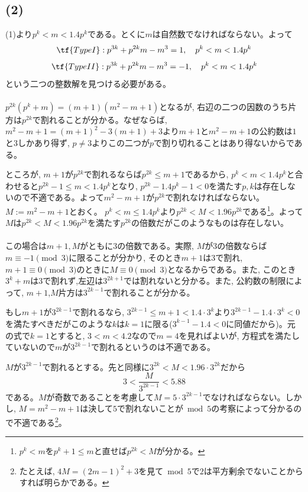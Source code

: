 \subsection*{(2)}
(1)より$p^{k} < m < 1.4p^{k}$である。とくに$m$は自然数でなければならない。よって
\[\tf{Type I}: p^{3k} + p^{2k}m - m^{3}=1,\quad p^{k} < m < 1.4p^{k}\]
\[\tf{Type II}: p^{3k} + p^{2k}m - m^{3}=-1,\quad p^{k} < m < 1.4p^{k}\]
という二つの整数解を見つける必要がある。\\
\\
$p^{2k}(p^{k} + m) = (m+1) (m^2-m+1)$となるが, 右辺の二つの因数のうち片方は$p^{2k}$で割れることが分かる。なぜならば, $m^2-m+1 = (m+1)^2 - 3(m+1) + 3$より$m+1$と$m^2 - m +1$の公約数は$1$と$3$しかあり得ず, $p\neq 3$よりこの二つが$p$で割り切れることはあり得ないからである。\par
ところが, $m+1$が$p^{2k}$で割れるならば$p^{2k} \leq m+1$であるから, $p^{k} < m < 1.4p^{k}$と合わせると$p^{2k} -1 \leq m < 1.4p^{k}$となり, $p^{2k} - 1.4p^{k} - 1 < 0$を満たす$p,k$は存在しないので不適である。よって$m^2 - m +1$が$p^{2k}$で割れなければならない。$M:=m^2- m+1$とおく。 $p^{k} < m \leq 1.4p^{k}$より$p^{2k} < M< 1.96p^{2k}$である\footnote{$p^{k} < m$を$p^{k} + 1\leq m$と直せば$p^{2k} < M$が分かる。}。よって$M$は$p^{2k} < M < 1.96p^{2k}$を満たす$p^{2k}$の倍数だがこのようなものは存在しない。\\
\\
この場合は$m+1, M$がともに3の倍数である。実際, $M$が$3$の倍数ならば$m\equiv -1\pmod{3}$に限ることが分かり, そのとき$m+1$は$3$で割れ, $m+1\equiv 0\pmod{3}$のときに$M\equiv 0\pmod{3}$となるからである。また, このとき$3^{k} + m$は$3$で割れず,左辺は$3^{2k+1}$では割れないと分かる。また, 公約数の制限によって, $m+1$,$M$片方は$3^{2k-1}$で割れることが分かる。\par
もし$m+1$が$3^{2k-1}$で割れるなら, $3^{2k-1} \leq m+1 < 1.4\cdot 3^{k}$より$3^{2k-1} - 1.4\cdot 3^{k} < 0$を満たすべきだがこのような$k$は$k=1$に限る($3^{k-1} - 1.4 < 0$に同値だから)。元の式で$k=1$とすると, $3<m<4.2$なので$m=4$を見ればよいが, 方程式を満たしていないので$m$が$3^{2k-1}$で割れるというのは不適である。\par
$M$が$3^{2k-1}$で割れるとする。先と同様に$3^{2k} < M < 1.96\cdot 3^{2k}$だから
\[3 < \dfrac{M}{3^{2k-1}} < 5.88\]
である。$M$が奇数であることを考慮して$M = 5\cdot 3^{2k-1}$でなければならない。しかし, $M=m^2 - m +1$は決して$5$で割れないことが$\bmod{5}$の考察によって分かるので不適である\footnote{たとえば, $4M = (2m-1)^{2} + 3$を見て$\bmod{5}$で$2$は平方剰余でないことからすれば明らかである。}。\\
